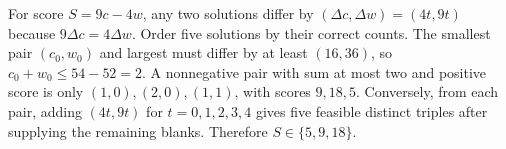 For score $S=9c-4w$, any two solutions differ by $(\Delta c,\Delta w)=(4t,9t)$ because $9\Delta c=4\Delta w$. Order five solutions by their correct counts. The smallest pair $(c_0,w_0)$ and largest must differ by at least $(16,36)$, so $c_0+w_0\le54-52=2$. A nonnegative pair with sum at most two and positive score is only $(1,0),(2,0),(1,1)$, with scores $9,18,5$. Conversely, from each pair, adding $(4t,9t)$ for $t=0,1,2,3,4$ gives five feasible distinct triples after supplying the remaining blanks. Therefore $\boxed{S\in\{5,9,18\}}$.
